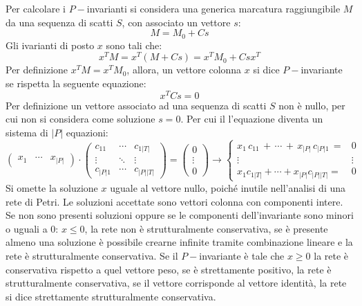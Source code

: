 \documentclass{article}
\numberwithin{equation}{subsection}
\begin{document}
Per calcolare i $P-$invarianti si considera una generica marcatura raggiungibile $M$ da una sequenza di scatti $S$, con associato un vettore $s$:
\begin{equation*}
    M=M_0+Cs
\end{equation*}
Gli ivarianti di posto $x$ sono tali che:
\begin{equation*}
    x^TM=x^T(M+Cs)=x^TM_0+Csx^T
\end{equation*}
Per definizione $x^TM=x^TM_0$, allora, un vettore colonna $x$ si dice $P-$invariante se rispetta la seguente equazione:
\begin{equation}
    x^TCs=0
\end{equation}
Per definizione un vettore associato ad una sequenza di scatti $S$ non è nullo, per cui non si considera come soluzione $s=0$. Per cui il l'equazione diventa un sistema 
di $|P|$ equazioni: 
\begin{equation}
    \begin{pmatrix}
        x_1 & \cdots & x_{|P|}
    \end{pmatrix}\cdot\begin{pmatrix}
        c_{11} & \cdots & c_{1|T|}\\
        \vdots & \ddots & \vdots\\
        c_{|P|1} & \cdots & c_{|P||T|}
    \end{pmatrix}=\begin{pmatrix}
        0\\
        \vdots\\
        0
    \end{pmatrix}\to\begin{cases}
        x_1\,c_{11}\,+\,\cdots\,+\,x_{|P|}\,c_{|P|1}\,=&0\\
        \vdots &\vdots\\
        x_1c_{1|T|}+\cdots+x_{|P|}c_{|P||T|}=&0
    \end{cases}
\end{equation}
Si omette la soluzione $x$ uguale al vettore nullo, poiché inutile nell'analisi di una rete di Petri. Le soluzioni accettate sono vettori colonna con componenti intere. Se 
non sono presenti soluzioni oppure se le componenti dell'invariante sono minori o uguali a $0$: $x\leq0$, la rete non è strutturalmente conservativa, se è presente almeno una 
soluzione è possibile crearne infinite tramite combinazione lineare e la rete è strutturalmente conservativa. Se il $P-$invariante è tale che $x\geq0$ la rete è conservativa 
rispetto a quel vettore peso, se è strettamente positivo, la rete è strutturalmente conservativa, se il vettore corrisponde al vettore identità, la rete si dice strettamente 
strutturalmente conservativa.  
\end{document}
